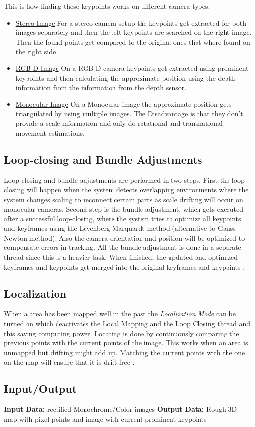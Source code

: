 This is how finding these keypoints works on different camera types:
\begin{itemize}
    \item \underline{Stereo Image} \newline
    For a stereo camera setup the keypoints get extracted for both images separately and then the left keypoints are searched on the right image. Then the found points get compared to the original ones that where found on the right side
    \item \underline{RGB-D Image} \newline
    On a RGB-D camera keypoints get extracted using prominent keypoints and then calculating the approximate position using the depth information from the information from the depth sensor.
    \item \underline{Monocular Image} \newline
    On a Monocular image the approximate position gets triangulated by using multiple images. The Disadvantage is that they don't provide a scale information and only do rotational and transnational movement estimations.
\end{itemize}

\subsection{Loop-closing and Bundle Adjustments}
Loop-closing and bundle adjustments are performed in two steps. First the loop-closing will happen when the system detects overlapping environments where the system changes scaling to reconnect certain parts as scale drifting will occur on monocular cameras.\newline
Second step is the bundle adjustment, which gets executed after a successful loop-closing, where the system tries to optimize all keypoints and keyframes using the Levenberg-Marquardt method (alternative to Gauss-Newton method).\cite{LevenbergMarquardMethod} Also the camera orientation and position will be optimized to compensate errors in tracking. All the bundle adjustment is done in a separate thread since this is a heavier task.\newline
When finished, the updated and optimized keyframes and keypoints get merged into the original keyframes and keypoints \cite{orbslam2}.

\subsection {Localization}
When a area has been mapped well in the past the \textit{Localization Mode} can be turned on which deactivates the Local Mapping and the Loop Closing thread and this saving computing power.
Locating is done by continuously comparing the previous points with the current points of the image. This works when an area is unmapped but drifting might add up.
Matching the current points with the one on the map will ensure that it is drift-free \cite{orbslam2}.

\subsection{Input/Output}
\textbf{Input Data:} rectified Monochrome/Color images\newline
\textbf{Output Data:} Rough 3D map with pixel-points and image with current prominent keypoints
